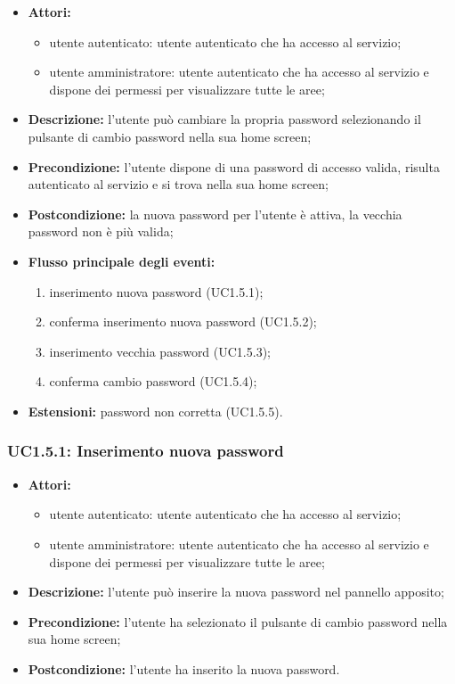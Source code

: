 \begin{itemize}
   	\item \textbf{Attori:}
    \begin{itemize}
    	\item utente autenticato: utente autenticato che ha accesso al servizio;
    	\item utente amministratore: utente autenticato che ha accesso al servizio e dispone dei permessi per visualizzare tutte le aree;
	\end{itemize}
	  \item \textbf{Descrizione:} l'utente può cambiare la propria password selezionando il pulsante di cambio password nella sua home screen;
    \item \textbf{Precondizione:} l'utente dispone di una password di accesso valida, risulta autenticato al servizio e si trova nella sua home screen;
    \item \textbf{Postcondizione:} la nuova password per l'utente è attiva, la vecchia password non è più valida;
	\item \textbf{Flusso principale degli eventi:}
    \begin{enumerate}
        \item inserimento nuova password (UC1.5.1);
        \item conferma inserimento nuova password (UC1.5.2);
        \item inserimento vecchia password (UC1.5.3);
        \item conferma cambio password (UC1.5.4);
    \end{enumerate}
   	\item \textbf{Estensioni:} password non corretta (UC1.5.5).

\end{itemize}

\subsubsection{UC1.5.1: Inserimento nuova password}

\begin{itemize}
   	\item \textbf{Attori:}
    \begin{itemize}
    	\item utente autenticato: utente autenticato che ha accesso al servizio;
    	\item utente amministratore: utente autenticato che ha accesso al servizio e dispone dei permessi per visualizzare tutte le aree;
	\end{itemize}
    \item \textbf{Descrizione:} l'utente può inserire la nuova password nel pannello apposito;
    \item \textbf{Precondizione:} l'utente ha selezionato il pulsante di cambio password nella sua home screen;
    \item \textbf{Postcondizione:} l'utente ha inserito la nuova password.
\end{itemize}

